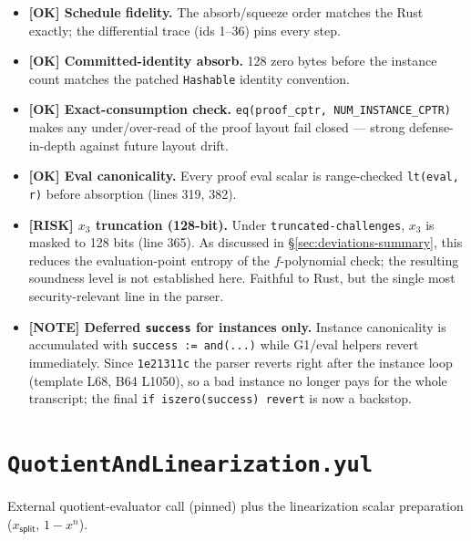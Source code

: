 \begin{itemize}
  \item \textcolor{tracegreen}{\textbf{[OK] Schedule fidelity.}} The
        absorb/squeeze order matches the Rust exactly; the differential
        trace (ids 1--36) pins every step.
  \item \textcolor{tracegreen}{\textbf{[OK] Committed-identity absorb.}}
        128 zero bytes before the instance count matches the patched
        \texttt{Hashable} identity convention.
  \item \textcolor{tracegreen}{\textbf{[OK] Exact-consumption check.}}
        \texttt{eq(proof\_\allowbreak{}cptr, NUM\_\allowbreak{}INSTANCE\_\allowbreak{}CPTR)} makes any
        under/over-read of the proof layout fail closed --- strong
        defense-in-depth against future layout drift.
  \item \textcolor{tracegreen}{\textbf{[OK] Eval canonicality.}} Every
        proof eval scalar is range-checked \texttt{lt(eval, r)} before
        absorption (lines 319, 382).
  \item \textcolor{rustorange}{\textbf{[RISK] $x_3$ truncation
        (128-bit).}} Under \texttt{truncated-challenges}, $x_3$ is
        masked to 128 bits (line 365). As discussed in
        \S\ref{sec:deviations-summary}, this reduces the
        evaluation-point entropy of the $f$-polynomial check; the
        resulting soundness level is not established here. Faithful to Rust,
        but the single most security-relevant line in the parser.
  \item \textcolor{mathpurple}{\textbf{[NOTE] Deferred \texttt{success}
        for instances only.}} Instance canonicality is accumulated with
        \texttt{success := and(...)} while G1/eval helpers revert
        immediately.  Since \texttt{1e21311c} the
        parser reverts right after the instance loop (template L68,
        B64 L1050), so a bad instance no longer pays for the whole
        transcript; the final \texttt{if iszero(success) revert} is now
        a backstop.
\end{itemize}

\section{\texttt{QuotientAndLinearization.yul}}
\label{sec:quotlin-audit}

External quotient-evaluator call (pinned) plus the linearization scalar
preparation ($x_{\mathsf{split}}$, $1-x^n$).

